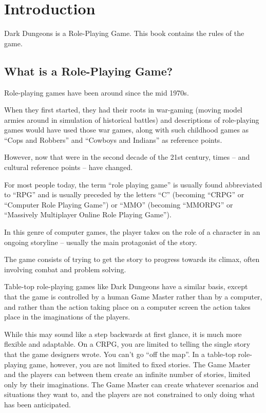 \chapter*{Introduction}
\chapterimage
\thispagestyle{plain}

\begin{multicols*}{2}
Dark Dungeons is a Role-Playing Game. This book contains the rules of the game.

\section{What is a Role-Playing Game?}
Role-playing games have been around since the mid 1970s.

When they first started, they had their roots in war-gaming (moving model armies around in simulation of historical battles) and descriptions of role-playing games would have used those war games, along with such childhood games as “Cops and Robbers” and “Cowboys and Indians” as reference points.

However, now that were in the second decade of the 21st century, times – and cultural reference points – have changed.

For most people today, the term “role playing game” is usually found abbreviated to “RPG” and is usually preceded by the letters “C” (becoming “CRPG” or “Computer Role Playing Game”) or “MMO” (becoming “MMORPG” or “Massively Multiplayer Online Role Playing Game”).

In this genre of computer games, the player takes on the role of a character in an ongoing storyline – usually the main protagonist of the story.

The game consists of trying to get the story to progress towards its climax, often involving combat and problem solving.

Table-top role-playing games like Dark Dungeons have a similar basis, except that the game is controlled by a human Game Master rather than by a computer, and rather than the action taking place on a computer screen the action takes place in the imaginations of the players.

While this may sound like a step backwards at first glance, it is much more flexible and adaptable. On a CRPG, you are limited to telling the single story that the game designers wrote. You can’t go “off the map”. In a table-top role-playing game, however, you are not limited to fixed stories. The Game Master and the players can between them create an infinite number of stories, limited only by their imaginations. The Game Master can create whatever scenarios and situations they want to, and the players are not constrained to only doing what has been anticipated.


\end{multicols*}
